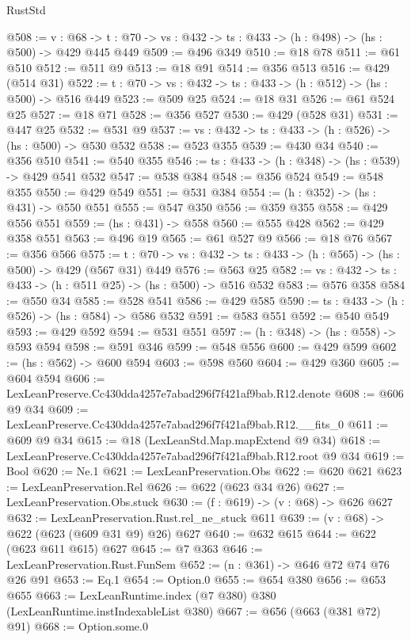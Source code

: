 \begin{lexlean}{RustStd}
\begin{coremodule}
@508 := {v : @68} ->
  {t : @70} -> {vs : @432} -> {ts : @433} -> (h : @498) -> (hs : @500) -> @429 @445 @449
@509 := @496 @349
@510 := @18 @78
@511 := @61 @510
@512 := @511 @9
@513 := @18 @91
@514 := @356 @513
@516 := @429 (@514 @31)
@522 := {t : @70} -> {vs : @432} -> {ts : @433} -> (h : @512) -> (hs : @500) -> @516 @449
@523 := @509 @25
@524 := @18 @31
@526 := @61 @524 @25
@527 := @18 @71
@528 := @356 @527
@530 := @429 (@528 @31)
@531 := @447 @25
@532 := @531 @9
@537 := {vs : @432} -> {ts : @433} -> (h : @526) -> (hs : @500) -> @530 @532
@538 := @523 @355
@539 := @430 @34
@540 := @356 @510
@541 := @540 @355
@546 := {ts : @433} -> (h : @348) -> (hs : @539) -> @429 @541 @532
@547 := @538 @384
@548 := @356 @524
@549 := @548 @355
@550 := @429 @549
@551 := @531 @384
@554 := (h : @352) -> (hs : @431) -> @550 @551
@555 := @547 @350
@556 := @359 @355
@558 := @429 @556 @551
@559 := (hs : @431) -> @558
@560 := @555 @428
@562 := @429 @358 @551
@563 := @496 @19
@565 := @61 @527 @9
@566 := @18 @76
@567 := @356 @566
@575 := {t : @70} -> {vs : @432} -> {ts : @433} -> (h : @565) -> (hs : @500) -> @429 (@567 @31) @449
@576 := @563 @25
@582 := {vs : @432} -> {ts : @433} -> (h : @511 @25) -> (hs : @500) -> @516 @532
@583 := @576 @358
@584 := @550 @34
@585 := @528 @541
@586 := @429 @585
@590 := {ts : @433} -> (h : @526) -> (hs : @584) -> @586 @532
@591 := @583 @551
@592 := @540 @549
@593 := @429 @592
@594 := @531 @551
@597 := (h : @348) -> (hs : @558) -> @593 @594
@598 := @591 @346
@599 := @548 @556
@600 := @429 @599
@602 := (hs : @562) -> @600 @594
@603 := @598 @560
@604 := @429 @360
@605 := @604 @594
@606 := LexLeanPreserve.Cc430dda4257e7abad296f7f421af9bab.R12.denote
@608 := @606 @9 @34
@609 := LexLeanPreserve.Cc430dda4257e7abad296f7f421af9bab.R12.__fits_0
@611 := @609 @9 @34
@615 := @18 (LexLeanStd.Map.mapExtend @9 @34)
@618 := LexLeanPreserve.Cc430dda4257e7abad296f7f421af9bab.R12.root @9 @34
@619 := Bool
@620 := Ne.{1}
@621 := LexLeanPreservation.Obs
@622 := @620 @621
@623 := LexLeanPreservation.Rel
@626 := @622 (@623 @34 @26)
@627 := LexLeanPreservation.Obs.stuck
@630 := (f : @619) -> (v : @68) -> @626 @627
@632 := LexLeanPreservation.Rust.rel_ne_stuck @611
@639 := (v : @68) -> @622 (@623 (@609 @31 @9) @26) @627
@640 := @632 @615
@644 := @622 (@623 @611 @615) @627
@645 := @7 @363
@646 := LexLeanPreservation.Rust.FunSem
@652 := (n : @361) -> @646 @72 @74 @76 @26 @91
@653 := Eq.{1}
@654 := Option.{0}
@655 := @654 @380
@656 := @653 @655
@663 := LexLeanRuntime.index (@7 @380) @380 (LexLeanRuntime.instIndexableList @380)
@667 := @656 (@663 (@381 @72) @91)
@668 := Option.some.{0}

\end{coremodule}
\end{lexlean}
